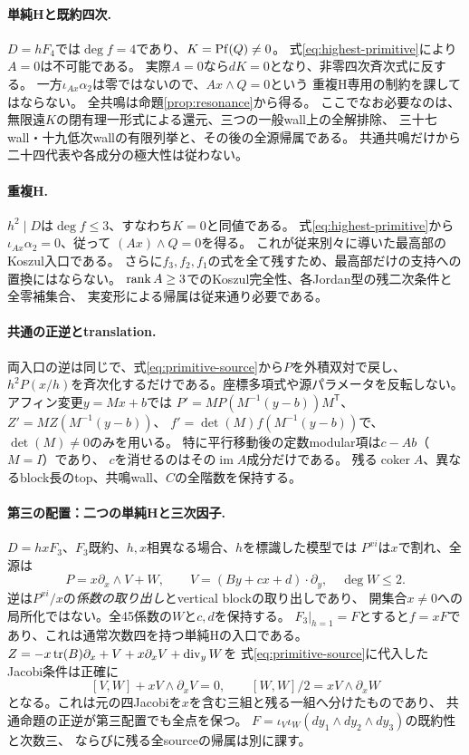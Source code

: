 \paragraph{単純Hと既約四次.}
$D=hF_4$では$\deg f=4$であり、$K=\operatorname{Pf}(Q)\ne0$。
式\eqref{eq:highest-primitive}により$A=0$は不可能である。
実際$A=0$なら$dK=0$となり、非零四次斉次式に反する。
一方$\iota_{Ax}\alpha_2$は零ではないので、$Ax\wedge Q=0$という
重複H専用の制約を課してはならない。
全共鳴は命題\ref{prop:resonance}から得る。
ここでなお必要なのは、無限遠$K$の閉有理一形式による還元、三つの一般wall上の全解排除、
三十七wall・十九低次wallの有限列挙と、その後の全源帰属である。
共通共鳴だけから二十四代表や各成分の極大性は従わない。

\paragraph{重複H.}
$h^2\mid D$は$\deg f\le3$、すなわち$K=0$と同値である。
式\eqref{eq:highest-primitive}から$\iota_{Ax}\alpha_2=0$、従って
$(Ax)\wedge Q=0$を得る。
これが従来別々に導いた最高部のKoszul入口である。
さらに$f_3,f_2,f_1$の式を全て残すため、最高部だけの支持への置換にはならない。
$\operatorname{rank} A\ge3$でのKoszul完全性、各Jordan型の残二次条件と全零補集合、
実変形による帰属は従来通り必要である。

\paragraph{共通の正逆とtranslation.}
両入口の逆は同じで、式\eqref{eq:primitive-source}から$P$を外積双対で戻し、
$h^2P(x/h)$を斉次化するだけである。座標多項式や源パラメータを反転しない。
アフィン変更$y=Mx+b$では
$P'=M P(M^{-1}(y-b))M^{\mathsf T}$、$Z'=MZ(M^{-1}(y-b))$、
$f'=\det(M)f(M^{-1}(y-b))$で、$\det(M)\ne0$のみを用いる。
特に平行移動後の定数modular項は$c-Ab$（$M=I$）であり、
$c$を消せるのはその$\operatorname{im}A$成分だけである。
残る$\operatorname{coker}A$、異なるblock長のtop、共鳴wall、$C$の全階数を保持する。

\paragraph{第三の配置：二つの単純Hと三次因子.}
$D=hxF_3$、$F_3$既約、$h,x$相異なる場合、$h$を標識した模型では
$P^{xi}$は$x$で割れ、全源は
\[
 P=x\partial_x\wedge V+W,\qquad
 V=(By+cx+d)\cdot\partial_y,\quad \deg W\le2.
\]
逆は$P^{xi}/x$の\emph{係数の取り出し}とvertical blockの取り出しであり、
開集合$x\ne0$への局所化ではない。全45係数の$W$と$c,d$を保持する。
$F_3|_{h=1}=F$とすると$f=xF$であり、これは通常次数四を持つ単純Hの入口である。
$Z=-x\operatorname{tr}(B)\partial_x+V+x\partial_xV+\operatorname{div}_y W$を
式\eqref{eq:primitive-source}に代入したJacobi条件は正確に
\[
 [V,W]+xV\wedge\partial_xV=0,\qquad
 [W,W]/2=xV\wedge\partial_xW
\]
となる。これは元の四Jacobiを$x$を含む三組と残る一組へ分けたものであり、
共通命題の正逆が第三配置でも全点を保つ。
$F=\iota_V\iota_W(dy_1\wedge dy_2\wedge dy_3)$の既約性と次数三、
ならびに残る全sourceの帰属は別に課す。

